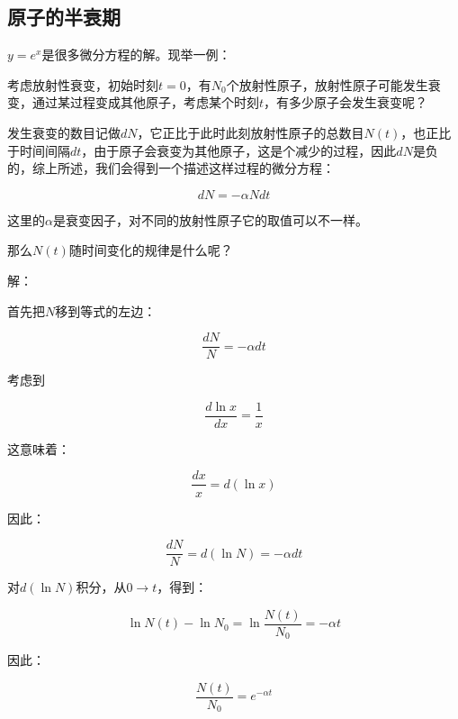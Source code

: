 
\subsection{原子的半衰期}

$y = e^x$是很多微分方程的解。现举一例：

考虑放射性衰变，初始时刻$t = 0$，有$N_0$个放射性原子，放射性原子可能发生衰变，通过某过程变成其他原子，考虑某个时刻$t$，有多少原子会发生衰变呢？

发生衰变的数目记做$d N$，它正比于此时此刻放射性原子的总数目$N(t)$，也正比于时间间隔$d t$，由于原子会衰变为其他原子，这是个减少的过程，因此$d N$是负的，综上所述，我们会得到一个描述这样过程的微分方程：

\begin{equation}
d N = - \alpha N dt
\end{equation}

这里的$\alpha$是衰变因子，对不同的放射性原子它的取值可以不一样。

那么$N(t)$随时间变化的规律是什么呢？

解：

首先把$N$移到等式的左边：

\begin{equation*}
\frac{dN}{N} = - \alpha dt
\end{equation*}

考虑到

\begin{equation}
\frac{d \ln x}{ d x} = \frac{1}{x}
\end{equation}

这意味着：

\begin{equation}
\frac{d x}{x} = d ( \ln x )
\end{equation}

因此：

\begin{equation*}
\frac{dN}{N} = d ( \ln N  ) = - \alpha dt
\end{equation*}

对$d (\ln N)$积分，从$0 \to t$，得到：

\begin{equation*}
\ln N(t ) - \ln N_0 = \ln \frac{N(t)}{N_0}  = - \alpha t
\end{equation*}

因此：

\begin{equation*}
\frac{N(t)}{N_0} = e^{- \alpha t}
\end{equation*}

